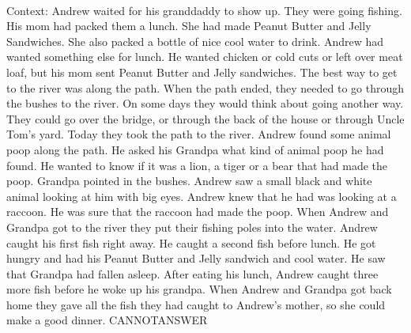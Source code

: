 \documentclass[11pt,a4paper, onecolumn]{article}
\begin{document}
\\ Context: Andrew waited for his granddaddy to show up. They were going fishing. His mom had packed them a lunch. She had made Peanut Butter and Jelly Sandwiches. She also packed a bottle of nice cool water to drink. Andrew had wanted something else for lunch. He wanted chicken or cold cuts or left over meat loaf, but his mom sent Peanut Butter and Jelly sandwiches. The best way to get to the river was along the path. When the path ended, they needed to go through the bushes to the river. On some days they would think about going another way. They could go over the bridge, or through the back of the house or through Uncle Tom's yard. Today they took the path to the river. Andrew found some animal poop along the path. He asked his Grandpa what kind of animal poop he had found. He wanted to know if it was a lion, a tiger or a bear that had made the poop. Grandpa pointed in the bushes. Andrew saw a small black and white animal looking at him with big eyes. Andrew knew that he had was looking at a raccoon. He was sure that the raccoon had made the poop. When Andrew and Grandpa got to the river they put their fishing poles into the water. Andrew caught his first fish right away. He caught a second fish before lunch. He got hungry and had his Peanut Butter and Jelly sandwich and cool water. He saw that Grandpa had fallen asleep. After eating his lunch, Andrew caught three more fish before he woke up his grandpa. When Andrew and Grandpa got back home they gave all the fish they had caught to Andrew's mother, so she could make a good dinner. CANNOTANSWER
\end{document}
